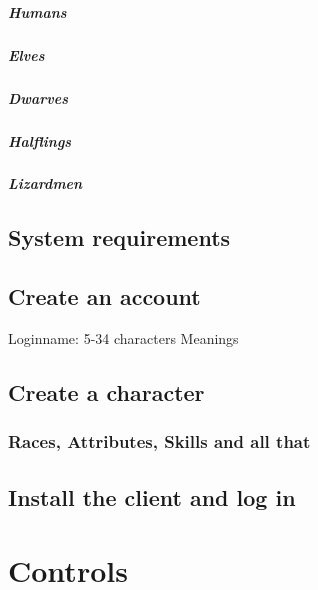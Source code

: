 \documentclass[a4paper,11pt]{scrreprt}
\begin{document}
\paragraph{Humans}
\paragraph{Elves}
\paragraph{Dwarves}
\paragraph{Halflings}
\paragraph{Lizardmen}


\section{System requirements}
\section{Create an account}
Loginname: 5-34 characters
Meanings
\section{Create a character}
\subsection{Races, Attributes, Skills and all that}
\section{Install the client and log in}

\chapter{Controls}
\end{document}
